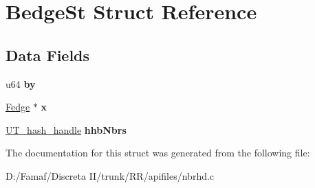 \hypertarget{struct_bedge_st}{\section{Bedge\+St Struct Reference}
\label{struct_bedge_st}
}
\subsection*{Data Fields}
\begin{DoxyCompactItemize}
\item 
\hypertarget{struct_bedge_st_aa6dc56cb8f5b6cb8baa214c78a4539bc}{u64 {\bfseries by}}\label{struct_bedge_st_aa6dc56cb8f5b6cb8baa214c78a4539bc}

\item 
\hypertarget{struct_bedge_st_a74c14dc83135dc1f56c35b64dca35d19}{\hyperlink{struct_fedge_st}{Fedge} $\ast$ {\bfseries x}}\label{struct_bedge_st_a74c14dc83135dc1f56c35b64dca35d19}

\item 
\hypertarget{struct_bedge_st_a63920485ac1ff2890e4815a01aee733c}{\hyperlink{struct_u_t__hash__handle}{U\+T\+\_\+hash\+\_\+handle} {\bfseries hhb\+Nbrs}}\label{struct_bedge_st_a63920485ac1ff2890e4815a01aee733c}

\end{DoxyCompactItemize}


The documentation for this struct was generated from the following file\+:\begin{DoxyCompactItemize}
\item 
D\+:/\+Famaf/\+Discreta I\+I/trunk/\+R\+R/apifiles/nbrhd.\+c\end{DoxyCompactItemize}
